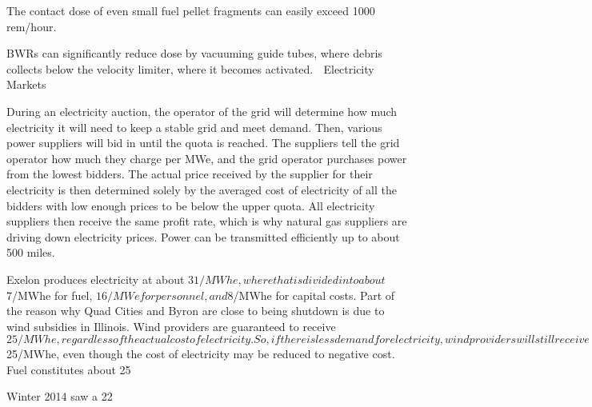 \documentclass[10pt]{article}
\begin{document}
The contact dose of even small fuel pellet fragments can easily exceed 1000 rem/hour. 

BWRs can significantly reduce dose by vacuuming guide tubes, where debris collects below the velocity limiter, where it becomes activated. 
Electricity Markets

During an electricity auction, the operator of the grid will determine how much electricity it will need to keep a stable grid and meet demand. Then, various power suppliers will bid in until the quota is reached. The suppliers tell the grid operator how much they charge per MWe, and the grid operator purchases power from the lowest bidders. The actual price received by the supplier for their electricity is then determined solely by the averaged cost of electricity of all the bidders with low enough prices to be below the upper quota. All electricity suppliers then receive the same profit rate, which is why natural gas suppliers are driving down electricity prices. Power can be transmitted efficiently up to about 500 miles. 

Exelon produces electricity at about $31/MWhe, where that is divided into about $7/MWhe for fuel, $16/MWe for personnel, and $8/MWhe for capital costs. Part of the reason why Quad Cities and Byron are close to being shutdown is due to wind subsidies in Illinois. Wind providers are guaranteed to receive $25/MWhe, regardless of the actual cost of electricity. So, if there is less demand for electricity, wind providers will still receive $25/MWhe, even though the cost of electricity may be reduced to negative cost. Fuel constitutes about 25%

Winter 2014 saw a 22%
\end{document}
